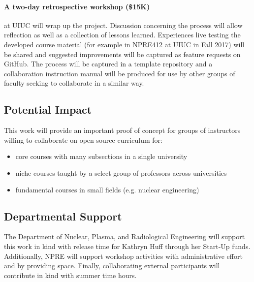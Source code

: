 \documentclass[11pt]{article}
\begin{document}
          \paragraph{A two-day retrospective workshop (\$15K)} at UIUC will wrap up the 
          project. Discussion concerning the process will allow reflection as 
          well as a collection of lessons learned.
          Experiences live testing the developed course material (for example 
          in NPRE412 at UIUC in Fall 2017) will be shared and suggested 
          improvements will be captured as feature requests on GitHub.  
          The process will be captured in a template repository 
          and a collaboration instruction manual will be produced
          for use by other groups of faculty seeking to collaborate in a 
          similar way. 

          \subsection*{Potential Impact}
          
          This work will provide an important proof of concept for groups of 
          instructors willing to collaborate on open source curriculum for:
          \begin{itemize}
                  \item core courses with many subsections in a single university
                  \item niche courses taught by a select group of professors across 
          universities
                  \item fundamental courses in small fields (e.g. nuclear engineering)
          \end{itemize}

          \subsection*{Departmental Support}
          The Department of Nuclear, Plasma, and Radiological Engineering will 
          support this work in kind with release time for Kathryn Huff through 
          her Start-Up funds.  Additionally, NPRE will support workshop activities 
          with administrative effort and by providing space. Finally, 
          collaborating external participants will contribute in kind with 
          summer time hours.


          
          

          
\end{document}
